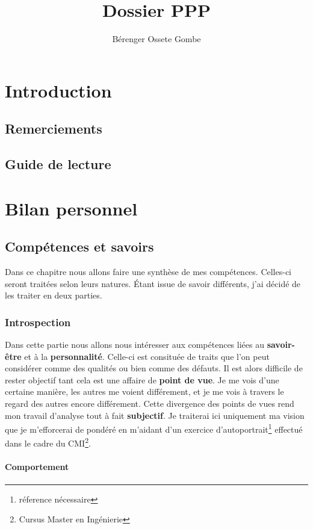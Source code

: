 \documentclass[a4paper,12pt, draft]{report}
\author{Bérenger Ossete Gombe}
\title{Dossier PPP}
\begin{document}
\maketitle

\newpage
\tableofcontents{}
\newpage

\part{Introduction}
\chapter{Remerciements}
\chapter{Guide de lecture}

\part{Bilan personnel}

\chapter{Compétences et savoirs} 

Dans ce chapitre nous allons faire une synthèse de mes compétences.
Celles-ci seront traitées selon leurs natures.
Étant issue de savoir différents, j'ai décidé de les traiter en deux parties.


\section{Introspection}
Dans cette partie nous allons nous intéresser aux compétences liées au \textbf{savoir-être} et à la \textbf{personnalité}. Celle-ci est consituée de traits que l'on peut considérer comme des qualités ou bien comme des défauts. Il est alors difficile de rester objectif tant cela est une affaire de \textbf{point de vue}. Je me vois d'une certaine manière, les autres me voient différement, et je me vois à travers le regard des autres encore différement. Cette divergence des points de vues rend mon travail d'analyse tout à fait \textbf{subjectif}. Je traiterai ici uniquement ma vision que je m'efforcerai de pondéré en m'aidant d'un exercice d'autoportrait\footnote{réference nécessaire} effectué dans le cadre du CMI\footnote{Cursus Master en Ingénierie}.

\newpage
\subsection{Comportement}
\end{document}
